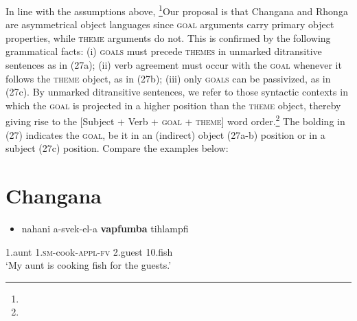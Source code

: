 \documentclass[output=paper]{langsci/langscibook}
\begin{document}
In line with the assumptions above, \footnote{}\textstyleFontepargpadroi{/}Our proposal is that Changana and Rhonga are asymmetrical object languages since \textsc{goal} arguments carry primary object properties, while \textsc{theme} arguments do not. This is confirmed by the following grammatical facts: (i) \textsc{goals} must precede \textsc{themes} in unmarked ditransitive sentences as in (27a); (ii) verb agreement must occur with the \textsc{goal} whenever it follows the \textsc{theme} object, as in (27b); (iii) only \textsc{goals} can be passivized, as in (27c). By unmarked ditransitive sentences, we refer to those syntactic contexts in which the \textsc{goal} is projected in a higher position than the \textsc{theme} object, thereby giving rise to the [Subject + Verb + \textsc{goal} + \textsc{theme}] word order.\footnote{} The bolding in (27) indicates the \textsc{goal}, be it in an (indirect) object (27a-b) position or in a subject (27c) position. Compare the examples below:

\chapter[Changana]{Changana}
\label{bkm:Ref455885646}\setcounter{itemize}{0}
\begin{itemize}
\item \gll nahani       a-svek-el-a                  \textbf{vapfumba}       tihlampfi\\
\end{itemize}
     1.aunt        1.\textsc{sm}{}-cook-\textsc{appl-fv}     2.guest            10.fish\\
\glt ‘My aunt is cooking fish for the guests.’
\z
\end{document}
